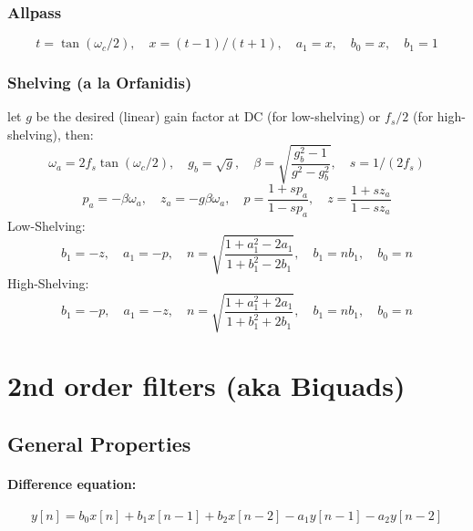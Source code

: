 \subsubsection{Allpass}
\begin{equation}
  t = \tan( \omega_c / 2 ), \quad x = (t-1)/(t+1), \quad a_1 = x, \quad b_0 = x, \quad b_1 = 1
\end{equation}

\subsubsection{Shelving (a la Orfanidis)} let $g$ be the desired (linear) gain factor at DC (for low-shelving) or $f_s/2$ (for high-shelving), then:
\begin{equation}
 \omega_a = 2 f_s \tan(\omega_c / 2), \quad g_b = \sqrt{g}, \quad \beta = \sqrt{ \frac{g_b^2-1}{g^2-g_b^2} }, \quad s = 1 / (2 f_s)
\end{equation}
\begin{equation}
 p_a = -\beta \omega_a, \quad z_a = -g \beta \omega_a, \quad p = \frac{1+s p_a}{1-s p_a}, \quad z = \frac{1+s z_a}{1-s z_a}
\end{equation}
Low-Shelving:
\begin{equation}
 b_1 = -z, \quad a_1 = -p, \quad n = \sqrt{ \frac{1+a_1^2-2a_1}{1+b_1^2-2 b_1} }, \quad b_1 = n b_1, \quad b_0 = n
\end{equation}
High-Shelving:
\begin{equation}
 b_1 = -p, \quad a_1 = -z, \quad n = \sqrt{ \frac{1+a_1^2+2a_1}{1+b_1^2+2 b_1} }, \quad b_1 = n b_1, \quad b_0 = n
\end{equation}


\section{2nd order filters (aka Biquads)}

\subsection{General Properties}

\paragraph{Difference equation:}
\begin{equation}
 y[n] = b_0 x[n] + b_1 x[n-1] + b_2 x[n-2] - a_1 y[n-1] - a_2 y[n-2]
\end{equation}

